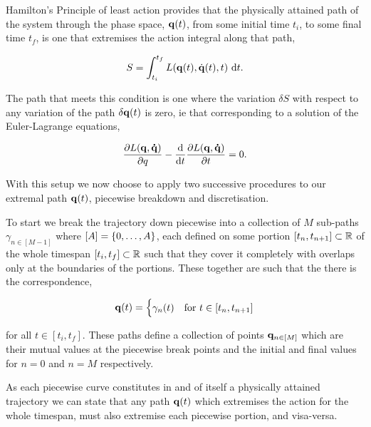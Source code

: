 \documentclass[10pt]{iopart}
\begin{document}
Hamilton's Principle of least action \cite{goldsteinClassicalMechanics2000} provides that the physically attained path of the system through the phase space, $\vb q(t)$, from some initial time $t_i$, to some final time $t_f$, is one that extremises the action integral along that path,

\begin{equation}
\label{eq:action-integral}
	S = \int_{t_i}^{t_f} L(\vb{q}(t), \dot{\vb{q}}(t), t) ~\mathrm{d} t.
\end{equation}

The path that meets this condition is one where the variation $\delta S$ with respect to any variation of the path $\delta \vb q(t)$ is zero, ie that corresponding to a solution of the Euler-Lagrange equations,

\begin{equation}
	\label{eq:euler-lagrange}
	\frac{\partial L(\vb q, \vb{\dot q})}{\partial q} - \frac{\dd}{\dd t}\frac{\partial L(\vb q, \vb{\dot q})}{\partial t} = 0.
\end{equation}


With this setup we now choose to apply two successive procedures to our extremal path $\vb q(t)$, piecewise breakdown and discretisation.

To start we break the trajectory down piecewise into a collection of $M$ sub-paths $\gamma_{n \in [M - 1]}$ where $[A] = \left\{0, \dots, A\right\}$, each defined on some portion $[t_n, t_{n + 1}] \subset \mathbb{R}$ of the whole timespan $[t_i, t_f] \subset \mathbb{R}$ such that they cover it completely with overlaps only at the boundaries of the portions. These together are such that the there is the correspondence,

\begin{equation}
	\vb q(t) = \begin{cases}
		\gamma_n(t) &\text{for~} t \in [t_n, t_{n + 1}]
	\end{cases}
\end{equation}

for all $t \in [t_i, t_f]$. These paths define a collection of points $\vb q_{n \in [M]}$ which are their mutual values at the piecewise break points and the initial and final values for $n = 0$ and $n = M$ respectively.

As each piecewise curve constitutes in and of itself a physically attained trajectory we can state that any path $\vb{q}(t)$ which extremises the action for the whole timespan, must also extremise each piecewise portion, and visa-versa. 
\end{document}
